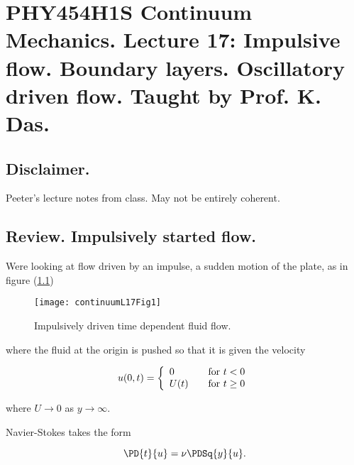 
%

\chapter{PHY454H1S Continuum Mechanics.  Lecture 17: Impulsive flow.  Boundary layers.  Oscillatory driven flow.  Taught by Prof. K. Das.}
\label{chap:continuumL17}
{}
\date{Mar 16, 2012}

\beginArtWithToc

\section{Disclaimer.}

Peeter's lecture notes from class.  May not be entirely coherent.

\section{Review.  Impulsively started flow.}

Were looking at flow driven by an impulse, a sudden motion of the plate, as in figure (\ref{fig:continuumL17:continuumL17Fig1})
\begin{figure}[htp]
   \centering
   \texttt{[image: continuumL17Fig1]}
   \caption{Impulsively driven time dependent fluid flow.}\label{fig:continuumL17:continuumL17Fig1}
\end{figure}

where the fluid at the origin is pushed so that it is given the velocity

\begin{equation}\label{eqn:continuumL17:20}
u(0, t) = 
\left\{
\begin{array}{l l}
0 & \quad \mbox{for $t < 0$} \\
U(t) & \quad \mbox{for $t \ge 0$} \\
\end{array}
\right.
\end{equation}

where $U \rightarrow 0$ as $y \rightarrow \infty$.

Navier-Stokes takes the form

\begin{equation}\label{eqn:continuumL17:40}
\PD{t}{u} = \nu \PDSq{y}{u}.
\end{equation}

